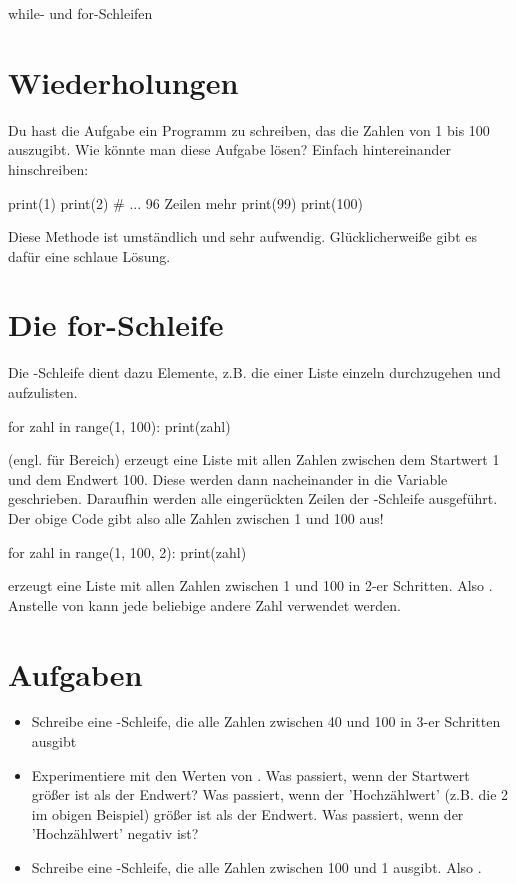 \documentclass{\VorlagenPfad/coderdojokatext}
\newcommand{\Titel}{while- und for-Schleifen}
\begin{document}
\begin{center}
	{\huge \Titel}
\end{center}

\section{Wiederholungen} Du hast die Aufgabe ein Programm zu schreiben, das die Zahlen von 1 bis 100 auszugibt. Wie könnte man diese Aufgabe lösen? Einfach hintereinander hinschreiben:

\begin{pythoncode}
print(1)
print(2)
# ... 96 Zeilen mehr
print(99)
print(100)
\end{pythoncode}

Diese Methode ist umständlich und sehr aufwendig. Glücklicherweiße gibt es dafür eine schlaue Lösung.

\section{Die for-Schleife} Die -Schleife dient dazu Elemente, z.B. die einer Liste einzeln durchzugehen und aufzulisten.

\begin{pythoncode}
for zahl in range(1, 100):
	print(zahl)
\end{pythoncode}

 (engl. für Bereich) erzeugt eine Liste mit allen Zahlen zwischen dem Startwert 1 und dem Endwert 100. Diese werden dann nacheinander in die Variable  geschrieben. Daraufhin werden alle eingerückten Zeilen der -Schleife ausgeführt.
\\
Der obige Code gibt also alle Zahlen zwischen 1 und 100 aus!

\begin{pythoncode}
for zahl in range(1, 100, 2):
	print(zahl)
\end{pythoncode}
 erzeugt eine Liste mit allen Zahlen zwischen 1 und 100 in 2-er Schritten. Also . Anstelle von  kann jede beliebige andere Zahl verwendet werden.

\section{Aufgaben}
\begin{itemize}
	\item Schreibe eine -Schleife, die alle Zahlen zwischen 40 und 100 in 3-er Schritten ausgibt
	\item Experimentiere mit den Werten von . Was passiert, wenn der Startwert größer ist als der Endwert? Was passiert, wenn der 'Hochzählwert' (z.B. die 2 im obigen Beispiel) größer ist als der Endwert. Was passiert, wenn der 'Hochzählwert' negativ ist?
	\item Schreibe eine -Schleife, die alle Zahlen zwischen 100 und 1 ausgibt. Also .
\end{itemize}
\end{document}
